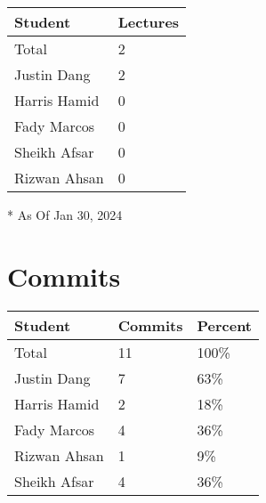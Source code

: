 \documentclass{article}
\begin{document}

\begin{table}[H]
\centering
\begin{tabular}{ll}
\toprule
\textbf{Student} & \textbf{Lectures}\\
\midrule
Total & 2\\
Justin Dang & 2\\
Harris Hamid & 0\\
Fady Marcos & 0\\
Sheikh Afsar & 0\\
Rizwan Ahsan & 0\\
\bottomrule
\end{tabular}
\end{table}

* As Of Jan 30, 2024

\section{Commits}


\begin{table}[H]
\centering
\begin{tabular}{lll}
\toprule
\textbf{Student} & \textbf{Commits} & \textbf{Percent}\\
\midrule
Total & 11 & 100\% \\
Justin Dang & 7 & 63\% \\
Harris Hamid & 2 & 18\% \\
Fady Marcos & 4 & 36\% \\
Rizwan Ahsan & 1 & 9\% \\
Sheikh Afsar & 4 & 36\% \\
\bottomrule
\end{tabular}
\end{table}

\end{document}
